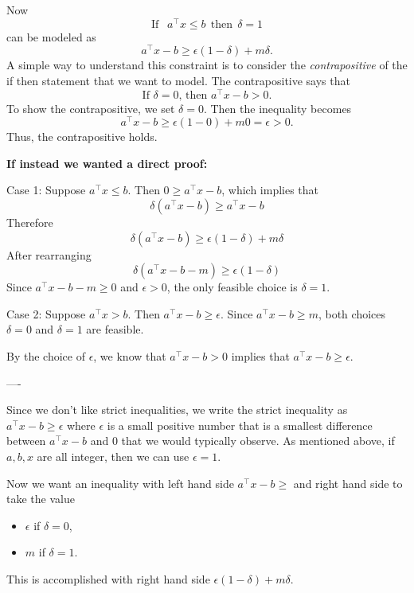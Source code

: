Now
\begin{equation}
\text{If } \ \ a^\top x \leq b  \ \ \text{then}\ \ \delta = 1
\end{equation}
can be modeled as 
\begin{equation}
a^\top x -b  \geq  \epsilon(1-\delta) + m \delta.
\end{equation}
A simple way to understand this constraint is to consider the \emph{contrapositive} of the if then statement that we want to model.  The contrapositive says that 
\begin{equation}
\text{If $\delta = 0$, then $a^\top x - b > 0$.}
\end{equation}
To show the contrapositive, we set $\delta = 0$.  Then the inequality becomes 
$$
a^\top x - b \geq \epsilon(1-0) + m0 = \epsilon > 0.
$$
Thus, the contrapositive holds.

\textbf{If instead we wanted a direct proof:}

Case 1: Suppose $a^\top x \leq b$.  Then $0 \geq a^\top x - b$, which implies that 
$$
\delta(a^\top x - b) \geq a^\top x - b
$$
Therefore
$$
\delta(a^\top x - b) \geq \epsilon(1-\delta) + m \delta
$$
After rearranging
$$
\delta(a^\top x - b - m) \geq \epsilon(1-\delta)
$$
Since $a^\top x - b - m \geq 0$ and $\epsilon > 0$, the only feasible choice is $\delta = 1$.


Case 2:  Suppose $a^\top x > b$.  Then $a^\top x - b \geq \epsilon$.    Since $a^\top x -b \geq m$, both choices $\delta = 0$ and $\delta = 1$ are feasible.

By the choice of $\epsilon$,  we know that $a^\top x -b > 0$ implies that $a^\top x - b \geq \epsilon$.  



----


Since we don't like strict inequalities, we write the strict inequality as $a^\top x - b \geq \epsilon$ where $\epsilon$ is a small positive number that is a smallest difference between $a^\top x - b$ and $0$ that we would typically observe.  As mentioned above, if $a,b,x$ are all integer, then we can use $\epsilon = 1$.

Now we want an inequality with left hand side $a^\top x - b \geq$ and right hand side to take the value 
\begin{itemize}
\item $\epsilon$ if $\delta = 0$,
\item $m$ if $\delta = 1$.
\end{itemize}
This is accomplished with right hand side $\epsilon (1-\delta) + m\delta$.

